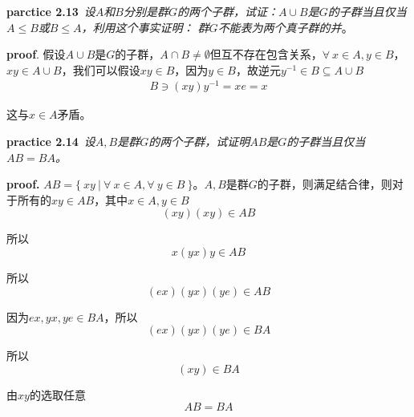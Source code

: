 \begin{mdframed}
    \textbf{parctice 2.13}\ \textsl{设$A$和$B$分别是群$G$的两个子群，试证：$A\cup B$是$G$的子群当且仅当$A\leqslant B$或$B\leqslant A$，利用这个事实证明： 群$G$不能表为两个真子群的并}。

    \vspace*{1em}

    \textbf{proof}. 假设$A\cup B$是$G$的子群，$A\cap B\neq \emptyset$但互不存在包含关系，$\forall\ x\in A,y\in B$，$xy\in A\cup B$，我们可以假设$xy\in B$，因为$y\in B$，故逆元$y^{-1}\in B\subseteq A\cup B$
    \begin{equation}
        \begin{aligned}
            B\ni (xy)y^{-1}=xe=x
        \end{aligned}
    \end{equation}

    这与$x\in A$矛盾。
\end{mdframed}

\newpage

\begin{mdframed}
    \textbf{practice 2.14}\ \textsl{设$A,B$是群$G$的两个子群，试证明$AB$是$G$的子群当且仅当$AB=BA$。}

    \vspace*{1em}

    \textbf{proof.} $AB=\{\ xy\ |\ \forall\ x\in A,\forall\ y\in B\ \}$。$A,B$是群$G$的子群，则满足结合律，则对于所有的$xy\in AB$，其中$x\in A,y\in B$
    \begin{equation}
        (xy)(xy)\in AB
    \end{equation}

    所以
    \begin{equation}
        x(yx)y\in AB
    \end{equation}

    所以
    \begin{equation}
        (ex)(yx)(ye)\in AB
    \end{equation}

    因为$ex,yx,ye\in BA$，所以
    \begin{equation}
        (ex)(yx)(ye)\in BA
    \end{equation}

    所以
    \begin{equation}
        (xy)\in BA
    \end{equation}

    由$xy$的选取任意
    \begin{equation}
        AB=BA
    \end{equation}
\end{mdframed}

